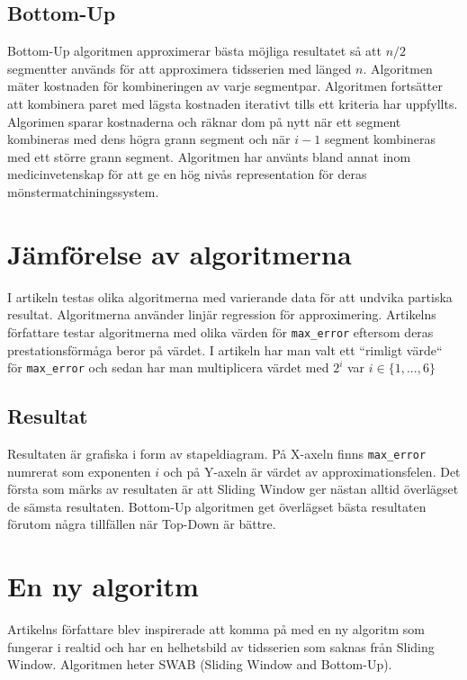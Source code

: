 \documentclass{article}
\begin{document}
\subsection{Bottom-Up}

Bottom-Up algoritmen approximerar bästa möjliga resultatet så att $n/2$ segmentter används för att approximera tidsserien med länged $n$. Algoritmen mäter kostnaden för kombineringen av varje segmentpar. Algoritmen fortsätter att kombinera paret med lägsta kostnaden iterativt tills ett kriteria har uppfyllts. Algorimen sparar kostnaderna och räknar dom på nytt när ett segment kombineras med dens högra grann segment och när $i-1$ segment kombineras med ett större grann segment. Algoritmen har använts bland annat inom medicinvetenskap för att ge en hög nivås representation för deras mönstermatchiningssystem.

\section{Jämförelse av algoritmerna}

I artikeln testas olika algoritmerna med varierande data för att undvika partiska resultat. Algoritmerna använder linjär regression för approximering. Artikelns författare testar algoritmerna med olika värden för \texttt{max_error} eftersom deras prestationsförmåga beror på värdet. I artikeln har man valt ett ``rimligt värde`` för \texttt{max_error} och sedan har man multiplicera värdet med $2^i$ var $i \in \{ 1, ..., 6 \}$

\subsection{Resultat}

Resultaten är grafiska i form av stapeldiagram. På X-axeln finns \texttt{max_error} numrerat som exponenten $i$ och på Y-axeln är värdet av approximationsfelen. Det första som märks av resultaten är att Sliding Window ger nästan alltid överlägset de sämsta resultaten. Bottom-Up algoritmen get överlägset bästa resultaten förutom några tillfällen när Top-Down är bättre.

\section{En ny algoritm}

Artikelns författare blev inspirerade att komma på med en ny algoritm som fungerar i realtid och har en helhetsbild av tidsserien som saknas från Sliding Window. Algoritmen heter SWAB (Sliding Window and Bottom-Up).
\end{document}
